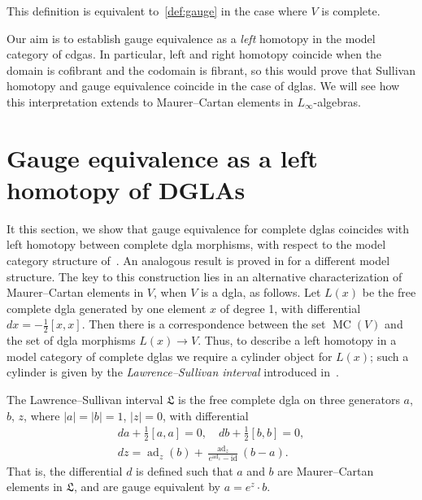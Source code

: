 \documentclass[a4paper,reqno]{amsart}
\theoremstyle{plain}
\theoremstyle{definition}
\theoremstyle{remark}
\newcommand{\id}{\mathrm{id}}
\DeclareMathOperator{\ad}{ad}
\newcommand{\lie}[1]{\mathfrak{#1}}
\DeclareMathOperator{\MC}{MC}
\begin{document}
This definition is equivalent to~\cref{def:gauge} in the case where $V$ is complete.

Our aim is to establish gauge equivalence as a \emph{left} homotopy in the model category of cdgas.
In particular, left and right homotopy coincide when the domain is cofibrant and the codomain is fibrant, so this would prove that Sullivan homotopy and gauge equivalence coincide in the case of dglas. 
We will see how this interpretation extends to Maurer--Cartan elements in $L_{\infty}$-algebras.


\section{Gauge equivalence as a left homotopy of DGLAs}
\label{gauge_left_dgla}

It this section, we show that gauge equivalence for complete dglas coincides with left homotopy between complete dgla morphisms, with respect to the model category structure of~\cite{lm15}. 
An analogous result is proved in \cite{bm13,bfmt} for a different model structure.
The key to this construction lies in an alternative characterization of Maurer--Cartan elements in $V$, when $V$ is a dgla, as follows.
Let $L(x)$ be the free complete dgla generated by one element $x$ of degree 1, with differential $dx = -\frac{1}{2}[x,x]$.
Then there is a correspondence between the set $\MC(V)$ and the set of dgla morphisms $L(x) \to V$.
Thus, to describe a left homotopy in a model category of complete dglas we require a cylinder object for $L(x)$; such a cylinder is given by the \emph{Lawrence--Sullivan interval} introduced in~\cite{ls14}.

The Lawrence--Sullivan interval $\mathfrak{L}$ is the free complete dgla on three generators $a$, $b$, $z$, where $|a|=|b|=1$, $|z|=0$, with differential 
\begin{gather*}
  da+\frac{1}{2}[a,a]=0, \quad db+\frac{1}{2}[b,b]=0,\\
  dz = \ad_z(b)+\frac{\ad_z}{e^{\ad_z}-\id}(b-a).
\end{gather*} 
That is, the differential $d$ is defined such that $a$ and $b$ are Maurer--Cartan elements in $\lie{L}$, and are gauge equivalent by $a = e^z \cdot b$. 
\end{document}
